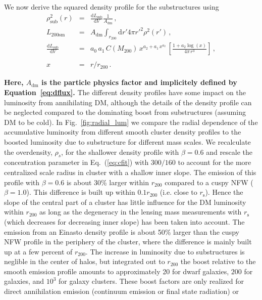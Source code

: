 \documentclass[10pt,aps,pra,reprint,amsmath,amsfonts,amssymb,showpacs,nofootinbib,floatfix]{revtex4-1}
\def\C#1{{\bf #1}}
\newcommand{\rmn}{\mathrm}
\newcommand{\s}{\rmn{s}}
\newcommand{\sm}{\rmn{sm}}
\newcommand{\dd}{\rmn{d}}
\newcommand{\rhos}{\ensuremath{\rho_s}}
\newcommand{\rvir}{r_{200}}
\newcommand{\mvir}{M_{200}}
\begin{document}
We now derive the squared density profile for the substructures
using
\begin{eqnarray}
\rho_\rmn{sub}^2(r) &=& \frac{\dd L_\rmn{sub}}{\dd V} \frac{1}{A_{\rmn{dm}}}\,,\label{eq:rho_sub}\\
L_{200\sm} &=&  A_{\rmn{dm}} \int_{\rvir} \dd r' 4\pi r'^2 \rho^2(r')\,,\label{eq:Lsm}\\
 \frac{\dd L_\rmn{sub}}{\dd V} &=& a_0\,a_1\,C(\mvir)\,x^{a_2+a_1\,x^{a_2}}\,
\left[\frac{1+a_2\log(x)}{4\pi\,r^3}\right]\,,\nonumber\\
\\
x &=& r/\rvir\,.\label{eq:xvir}
\end{eqnarray} 

\C{Here, $A_{\rmn{dm}}$ is the particle physics factor and implicitely defined by Equation~\ref{eq:dflux}.}
The different density profiles have some impact on the luminosity from
annihilating DM, although the details of the density profile can be
neglected compared to the dominating boost from substructures
(assuming DM to be cold). In Fig.~\ref{fig:radial_lum} we compare the
radial dependence of the accumulative luminosity from different smooth
cluster density profiles to the boosted luminosity due to substructure
for different mass scales. We recalculate the overdensity, $\rhos$,
for the shallower density profile with $\beta=0.6$ and rescale the
concentration parameter in Eq.~(\ref{eq:cfit}) with $300/160$
\cite{2011ApJ...728L..39N} to account for the more centralized scale
radius in cluster with a shallow inner slope. The emission of this
profile with $\beta=0.6$ is about 30\% larger within $\rvir$ compared
to a cuspy NFW ($\beta=1.0$).  This difference is built up within
$0.1\rvir$ (i.e. close to $r_\s$). Hence the slope of the central part
of a cluster has little influence for the DM luminosity within $\rvir$
as long as the degeneracy in the lensing mass measurements with $r_\s$
(which decreases for decreasing inner slope) has been taken into
account. The emission from an Einasto density profile is about 50\%
larger than the cuspy NFW profile in the periphery of the cluster,
where the difference is mainly built up at a few percent of
$\rvir$. The increase in luminosity due to substructures is neglible
in the center of halos, but integrated out to $\rvir$ the boost
relative to the smooth emission profile amounts to approximately 20
for dwarf galaxies, $200$ for galaxies, and $10^3$ for galaxy
clusters. These boost factors are only realized for direct
annihilation emission (continuum emission or final state radiation) or
\end{document}
